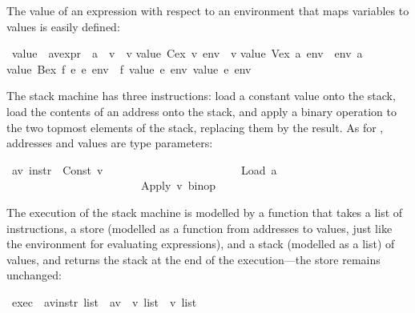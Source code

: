 \begin{isabellebody}
\begin{isamarkuptext}
The value of an expression with respect to an environment that maps variables to
values is easily defined:%
\end{isamarkuptext}%
\ value\ {\isacharcolon}{\isacharcolon}\ {\isachardoublequote}{\isacharparenleft}{\isacharprime}a{\isacharcomma}{\isacharprime}v{\isacharparenright}expr\ {\isasymRightarrow}\ {\isacharparenleft}{\isacharprime}a\ {\isasymRightarrow}\ {\isacharprime}v{\isacharparenright}\ {\isasymRightarrow}\ {\isacharprime}v{\isachardoublequote}\isanewline
{}\isanewline
{\isachardoublequote}value\ {\isacharparenleft}Cex\ v{\isacharparenright}\ env\ {\isacharequal}\ v{\isachardoublequote}\isanewline
{\isachardoublequote}value\ {\isacharparenleft}Vex\ a{\isacharparenright}\ env\ {\isacharequal}\ env\ a{\isachardoublequote}\isanewline
{\isachardoublequote}value\ {\isacharparenleft}Bex\ f\ e{}\ e{}{\isacharparenright}\ env\ {\isacharequal}\ f\ {\isacharparenleft}value\ e{}\ env{\isacharparenright}\ {\isacharparenleft}value\ e{}\ env{\isacharparenright}{\isachardoublequote}%
\begin{isamarkuptext}%
The stack machine has three instructions: load a constant value onto the
stack, load the contents of an address onto the stack, and apply a
binary operation to the two topmost elements of the stack, replacing them by
the result. As for , addresses and values are type parameters:%
\end{isamarkuptext}%
\ {\isacharparenleft}{\isacharprime}a{\isacharcomma}{\isacharprime}v{\isacharparenright}\ instr\ {\isacharequal}\ Const\ {\isacharprime}v\isanewline
\ \ \ \ \ \ \ \ \ \ \ \ \ \ \ \ \ \ \ \ \ \ \ {\isacharbar}\ Load\ {\isacharprime}a\isanewline
\ \ \ \ \ \ \ \ \ \ \ \ \ \ \ \ \ \ \ \ \ \ \ {\isacharbar}\ Apply\ {\isachardoublequote}{\isacharprime}v\ binop{\isachardoublequote}%
\begin{isamarkuptext}%
The execution of the stack machine is modelled by a function
 that takes a list of instructions, a store (modelled as a
function from addresses to values, just like the environment for
evaluating expressions), and a stack (modelled as a list) of values,
and returns the stack at the end of the execution---the store remains
unchanged:%
\end{isamarkuptext}%
\ exec\ {\isacharcolon}{\isacharcolon}\ {\isachardoublequote}{\isacharparenleft}{\isacharprime}a{\isacharcomma}{\isacharprime}v{\isacharparenright}instr\ list\ {\isasymRightarrow}\ {\isacharparenleft}{\isacharprime}a{\isasymRightarrow}{\isacharprime}v{\isacharparenright}\ {\isasymRightarrow}\ {\isacharprime}v\ list\ {\isasymRightarrow}\ {\isacharprime}v\ list{\isachardoublequote}\isanewline

\end{isabellebody}
